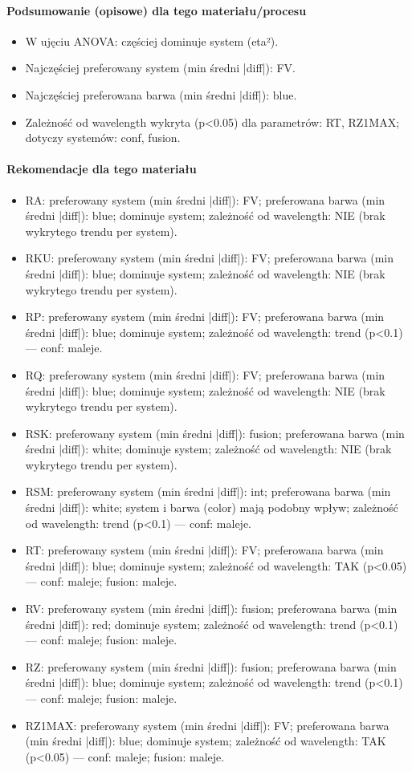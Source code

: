 \documentclass[
  10pt,
]{article}
\begin{document}
\paragraph{Podsumowanie (opisowe) dla tego materiału/procesu}
\begin{itemize}
\item W ujęciu ANOVA: częściej dominuje system (eta²).
\item Najczęściej preferowany system (min średni |diff|): FV.
\item Najczęściej preferowana barwa (min średni |diff|): blue.
\item Zależność od wavelength wykryta (p<0.05) dla parametrów: RT, RZ1MAX; dotyczy systemów: conf, fusion.
\end{itemize}
\paragraph{Rekomendacje dla tego materiału}
\begin{itemize}
\item RA: preferowany system (min średni |diff|): FV; preferowana barwa (min średni |diff|): blue; dominuje system; zależność od wavelength: NIE (brak wykrytego trendu per system).
\item RKU: preferowany system (min średni |diff|): FV; preferowana barwa (min średni |diff|): blue; dominuje system; zależność od wavelength: NIE (brak wykrytego trendu per system).
\item RP: preferowany system (min średni |diff|): FV; preferowana barwa (min średni |diff|): blue; dominuje system; zależność od wavelength: trend (p<0.1) — conf: maleje.
\item RQ: preferowany system (min średni |diff|): FV; preferowana barwa (min średni |diff|): blue; dominuje system; zależność od wavelength: NIE (brak wykrytego trendu per system).
\item RSK: preferowany system (min średni |diff|): fusion; preferowana barwa (min średni |diff|): white; dominuje system; zależność od wavelength: NIE (brak wykrytego trendu per system).
\item RSM: preferowany system (min średni |diff|): int; preferowana barwa (min średni |diff|): white; system i barwa (color) mają podobny wpływ; zależność od wavelength: trend (p<0.1) — conf: maleje.
\item RT: preferowany system (min średni |diff|): FV; preferowana barwa (min średni |diff|): blue; dominuje system; zależność od wavelength: TAK (p<0.05) — conf: maleje; fusion: maleje.
\item RV: preferowany system (min średni |diff|): fusion; preferowana barwa (min średni |diff|): red; dominuje system; zależność od wavelength: trend (p<0.1) — conf: maleje; fusion: maleje.
\item RZ: preferowany system (min średni |diff|): fusion; preferowana barwa (min średni |diff|): blue; dominuje system; zależność od wavelength: trend (p<0.1) — conf: maleje; fusion: maleje.
\item RZ1MAX: preferowany system (min średni |diff|): FV; preferowana barwa (min średni |diff|): blue; dominuje system; zależność od wavelength: TAK (p<0.05) — conf: maleje; fusion: maleje.
\end{itemize}
\end{document}
